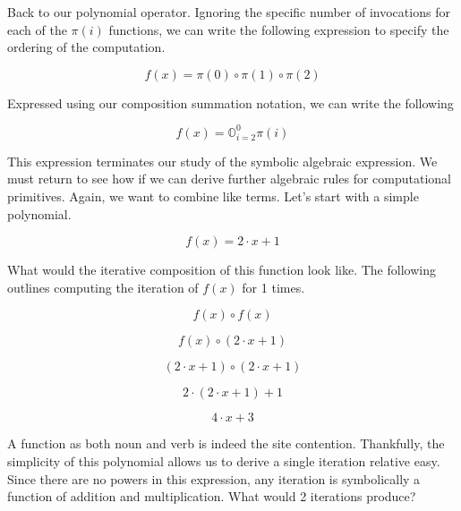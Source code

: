 \documentclass[12pt]{article}
\begin{document}
Back to our polynomial operator. Ignoring the specific number of invocations
for each of the $\pi(i)$ functions, we can write the following expression to
specify the ordering of the computation.

\begin{equation}
    f(x) = \pi(0) \circ \pi(1) \circ \pi(2)
\end{equation}

Expressed using our composition summation notation, we can write the following

\begin{equation}
    f(x) = \mathbb{O}_{i=2}^{0} \pi(i)
\end{equation}

This expression terminates our study of the symbolic algebraic expression. We
must return to see how if we can derive further algebraic rules for
computational primitives. Again, we want to combine like terms. Let's start
with a simple polynomial.

\begin{equation}
    f(x) = 2 \cdot x + 1
\end{equation}

What would the iterative composition of this function look like. The following
outlines computing the iteration of $f(x)$ for 1 times.

\begin{equation}
    f(x) \circ f(x)
\end{equation}

\begin{equation}
    f(x) \circ (2 \cdot x + 1)
\end{equation}

\begin{equation}
    (2 \cdot x + 1) \circ (2 \cdot x + 1)
\end{equation}

\begin{equation}
    2 \cdot (2 \cdot x + 1) + 1
\end{equation}

\begin{equation}
    4 \cdot x + 3
\end{equation}

A function as both noun and verb is indeed the site contention. Thankfully, the
simplicity of this polynomial allows us to derive a single iteration relative
easy. Since there are no powers in this expression, any iteration is
symbolically a function of addition and multiplication. What would 2 iterations
produce?
\end{document}
